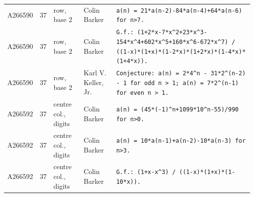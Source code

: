 \documentclass[11pt]{article}
\theoremstyle{definition}
\theoremstyle{remark}
\begin{document}
{\begin{longtable}{p{1.3cm}p{0.7cm}p{2.4cm}p{2.3cm}p{7.3cm}}
A266590 & 37 & row, base 2 & Colin Barker & \texttt{a(n)\allowbreak{} \allowbreak{}=\allowbreak{} \allowbreak{}21*\allowbreak{}a(n-\allowbreak{}2)\allowbreak{}-\allowbreak{}84*\allowbreak{}a(n-\allowbreak{}4)\allowbreak{}+\allowbreak{}64*\allowbreak{}a(n-\allowbreak{}6)\allowbreak{} \allowbreak{}for \allowbreak{}n>7.} \\
A266590 & 37 & row, base 2 & Colin Barker & \texttt{G.f.: \allowbreak{}(1+\allowbreak{}2*\allowbreak{}x-\allowbreak{}7*\allowbreak{}x\^{}2+\allowbreak{}23*\allowbreak{}x\^{}3-\allowbreak{}154*\allowbreak{}x\^{}4+\allowbreak{}602*\allowbreak{}x\^{}5+\allowbreak{}160*\allowbreak{}x\^{}6-\allowbreak{}672*\allowbreak{}x\^{}7)\allowbreak{} \allowbreak{}/\allowbreak{} \allowbreak{}((1-\allowbreak{}x)\allowbreak{}*\allowbreak{}(1+\allowbreak{}x)\allowbreak{}*\allowbreak{}(1-\allowbreak{}2*\allowbreak{}x)\allowbreak{}*\allowbreak{}(1+\allowbreak{}2*\allowbreak{}x)\allowbreak{}*\allowbreak{}(1-\allowbreak{}4*\allowbreak{}x)\allowbreak{}*\allowbreak{}(1+\allowbreak{}4*\allowbreak{}x)\allowbreak{})\allowbreak{}.} \\
A266590 & 37 & row, base 2 & Karl V. Keller, Jr. & \texttt{Conjecture: \allowbreak{}a(n)\allowbreak{} \allowbreak{}=\allowbreak{} \allowbreak{}2*\allowbreak{}4\^{}n \allowbreak{}-\allowbreak{} \allowbreak{}31*\allowbreak{}2\^{}(n-\allowbreak{}2)\allowbreak{} \allowbreak{}-\allowbreak{} \allowbreak{}1 \allowbreak{}for \allowbreak{}odd \allowbreak{}n \allowbreak{}> \allowbreak{}1; \allowbreak{}a(n)\allowbreak{} \allowbreak{}=\allowbreak{} \allowbreak{}7*\allowbreak{}2\^{}(n-\allowbreak{}1)\allowbreak{} \allowbreak{}for \allowbreak{}even \allowbreak{}n \allowbreak{}> \allowbreak{}1.} \\
A266592 & 37 & centre col., digits & Colin Barker & \texttt{a(n)\allowbreak{} \allowbreak{}=\allowbreak{} \allowbreak{}(45*\allowbreak{}(-\allowbreak{}1)\allowbreak{}\^{}n+\allowbreak{}1099*\allowbreak{}10\^{}n-\allowbreak{}55)\allowbreak{}/\allowbreak{}990 \allowbreak{}for \allowbreak{}n>0.} \\
A266592 & 37 & centre col., digits & Colin Barker & \texttt{a(n)\allowbreak{} \allowbreak{}=\allowbreak{} \allowbreak{}10*\allowbreak{}a(n-\allowbreak{}1)\allowbreak{}+\allowbreak{}a(n-\allowbreak{}2)\allowbreak{}-\allowbreak{}10*\allowbreak{}a(n-\allowbreak{}3)\allowbreak{} \allowbreak{}for \allowbreak{}n>3.} \\
A266592 & 37 & centre col., digits & Colin Barker & \texttt{G.f.: \allowbreak{}(1+\allowbreak{}x-\allowbreak{}x\^{}3)\allowbreak{} \allowbreak{}/\allowbreak{} \allowbreak{}((1-\allowbreak{}x)\allowbreak{}*\allowbreak{}(1+\allowbreak{}x)\allowbreak{}*\allowbreak{}(1-\allowbreak{}10*\allowbreak{}x)\allowbreak{})\allowbreak{}.} \\

\end{longtable}}
\end{document}

